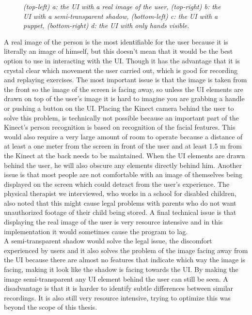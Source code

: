 \begin{figure}[H]
\begin{center}
 		\caption{\emph{(top-left) a: the UI with a real image of the user, (top-right) b: the UI with a semi-transparent shadow, (bottom-left) c: the UI with a puppet, (bottom-right) d: the UI with only hands visible. }}
 		\label{user visualizations}
 	\end{center}
 \end{figure}
 
 
A real image of the person is the most identifiable for the user because it is literally an image of himself, but this doesn't mean that it would be the best option to use in interacting with the UI. Though it has the advantage that it is crystal clear which movement the user carried out, which is good for recording and replaying exercises. The most important issue is that the image is taken from the front so the image of the screen is facing away, so unless the UI elements are drawn on top of the user's image it is hard to imagine you are grabbing a handle or pushing a button on the UI. Placing the Kinect camera behind the user to solve this problem, is technically not possible because an important part of the Kinect's person recognition is based on recognition of the facial features. This would also require a very large amount of room to operate because a distance of at least a one meter from the screen in front of the user and at least 1.5 m from the Kinect at the back needs to be maintained. When the UI elements are drawn behind the user, he will also obscure any elements directly behind him. Another issue is that most people are not comfortable with an image of themselves being displayed on the screen which could detract from the user's experience. The physical therapist we interviewed, who works in a school for disabled children, also noted that this might cause legal problems with parents who do not want unauthorized footage of their child being stored. A final technical issue is that displaying the real image of the user is very resource intensive and in this implementation it would sometimes cause the program to lag.\\
 
A semi-transparent shadow would solve the legal issue, the discomfort experienced by users and it also solves the problem of the image facing away from the UI because there are almost no features that indicate which way the image is facing, making it look like the shadow is facing towards the UI. By making the image semi-transparent any UI element behind the user can still be seen. A disadvantage is that it is harder to identify subtle differences between similar recordings. It is also still very resource intensive, trying to optimize this was beyond the scope of this thesis.\\
 
